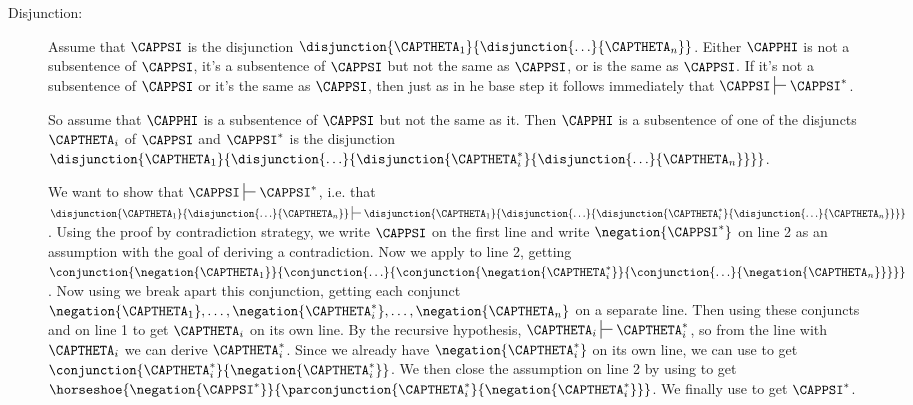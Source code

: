 \begin{PROOF}
\begin{description}
\begin{description}
\item[Disjunction:] Assume that $\CAPPSI$ is the disjunction $\disjunction{\CAPTHETA_1}{\disjunction{\ldots}{\CAPTHETA_{\integer{n}}}}$. 
Either $\CAPPHI$ is not a subsentence of $\CAPPSI$, it's a subsentence of $\CAPPSI$ but not the same as $\CAPPSI$, or is the same as $\CAPPSI$. 
If it's not a subsentence of $\CAPPSI$ or it's the same as $\CAPPSI$, then just as in he base step it follows immediately that $\CAPPSI\sststile{}{}\CAPPSI^*$.

So assume that $\CAPPHI$ is a subsentence of $\CAPPSI$ but not the same as it. 
Then $\CAPPHI$ is a subsentence of one of the disjuncts $\CAPTHETA_{\integer{i}}$ of $\CAPPSI$ and $\CAPPSI^*$ is the disjunction $\disjunction{\CAPTHETA_1}{\disjunction{\ldots}{\disjunction{\CAPTHETA_{\integer{i}}^*}{\disjunction{\ldots}{\CAPTHETA_{\integer{n}}}}}}$.

We want to show that $\CAPPSI\sststile{}{}\CAPPSI^*$, i.e. that $\disjunction{\CAPTHETA_1}{\disjunction{\ldots}{\CAPTHETA_{\integer{n}}}}\sststile{}{}\disjunction{\CAPTHETA_1}{\disjunction{\ldots}{\disjunction{\CAPTHETA_{\integer{i}}^*}{\disjunction{\ldots}{\CAPTHETA_{\integer{n}}}}}}$. 
Using the proof by contradiction strategy, we write $\CAPPSI$ on the first line and write $\negation{\CAPPSI^*}$ on line 2 as an assumption with the goal of deriving a contradiction. 
Now we apply  to line 2, getting $\conjunction{\negation{\CAPTHETA_1}}{\conjunction{\ldots}{\conjunction{\negation{\CAPTHETA_{\integer{i}}^*}}{\conjunction{\ldots}{\negation{\CAPTHETA_{\integer{n}}}}}}}$. 
Now using  we break apart this conjunction, getting each conjunct $\negation{\CAPTHETA_1},\ldots,\negation{\CAPTHETA_{\integer{i}}^*},\ldots,\negation{\CAPTHETA_{\integer{n}}}$ on a separate line. 
Then using these conjuncts and  on line 1 to get $\CAPTHETA_{\integer{i}}$ on its own line. 
By the recursive hypothesis, $\CAPTHETA_{\integer{i}}\sststile{}{}\CAPTHETA_{\integer{i}}^*$, so from the line with $\CAPTHETA_{\integer{i}}$ we can derive $\CAPTHETA_{\integer{i}}^*$. 
Since we already have $\negation{\CAPTHETA_{\integer{i}}^*}$ on its own line, we can use  to get $\conjunction{\CAPTHETA_{\integer{i}}^*}{\negation{\CAPTHETA_{\integer{i}}^*}}$. 
We then close the assumption on line 2 by using  to get $\horseshoe{\negation{\CAPPSI^*}}{\parconjunction{\CAPTHETA_{\integer{i}}^*}{\negation{\CAPTHETA_{\integer{i}}^*}}}$. 
We finally use  to get $\CAPPSI^*$.


\end{description}
\end{description}
\end{PROOF}
